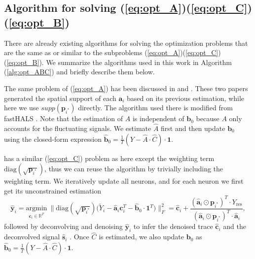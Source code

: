 \documentclass[10pt,letterpaper]{article}
\begin{document}
{\subsection{Algorithm for solving (\ref{eq:opt_A})(\ref{eq:opt_C})(\ref{eq:opt_B})} \label{sec:update_abc}

There are already existing algorithms for solving the optimization problems that are the same as or similar to the subproblems (\ref{eq:opt_A})(\ref{eq:opt_C})(\ref{eq:opt_B}). We summarize the algorithms used in this work in Algorithm (\ref{alg:opt_ABC}) and briefly describe them below. 

The same problem of (\ref{eq:opt_A}) has been discussed in \citep{Friedrich2017a} and \citep{Zhou2018}. These two papers generated the spatial support of each $\bm{a}_i$ based on its previous estimation, while here we use $supp(\bm{p}_{i^*})$ directly. The algorithm used there is modified from fastHALS \citep{Cichocki2009}. Note that the estimation of $A$ is independent of $\bm{b}_0$ because $A$ only accounts for the fluctuating signals. We estimate $\hat{A}$ first and then update $\bm{b}_0$ using the closed-form expression $\hat{\bm{b}}_0=\frac{1}{T}(Y-\hat{A}\cdot \hat{C})\cdot \bm{1}$.

\citep{Zhou2018} has a similar (\ref{eq:opt_C}) problem as here except the weighting term $\text{diag}(\sqrt{\bm{p}_{i^*}})$, thus we can reuse the algorithm by trivially including the weighting term. We iteratively update all neurons, and for each neuron we first get its unconstrained estimation 
\begin{equation}
  \hat{\bm{y}}_i = \underset{\bm{c}_i\in \mathbb{R}^T}{\text{argmin}} ~\|\text{diag}(\sqrt{\bm{p}_{i^*}}) \big(\tilde{Y}_i- \hat{\bm{a}}_i\bm{c}_i^T-\hat{\bm{b}}_0\cdot \bm{1}^T\big)\|_F^2 = \hat{\bm{c}}_i + \frac{(\hat{\bm{a}}_i\odot \bm{p}_{i^*})^T\cdot {Y}_{\text{res}}}{(\hat{\bm{a}}_i\odot \bm{p}_{i^*})^T\cdot\hat{\bm{a}}_i},  \label{eq:y_raw}
\end{equation}
followed by deconvolving and denoising $\hat{\bm{y}}_i$ to infer the denoised trace $\hat{\bm{c}}_i$ and the deconvolved signal $\hat{\bm{s}}_i$ \citep{Friedrich2017b}. Once $\hat{C}$ is estimated, we also update $\bm{b}_0$ as  $\hat{\bm{b}}_0=\frac{1}{T}({Y}-\hat{A}\cdot \hat{C})\cdot \bm{1}$.

}
\end{document}
